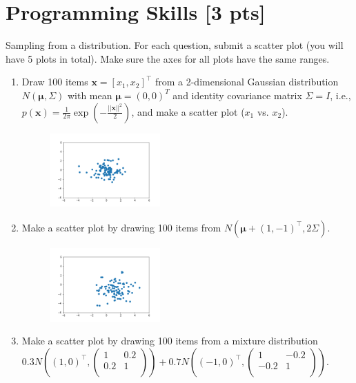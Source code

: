 \documentclass[a4paper]{article}
\theoremstyle{definition}
\newenvironment{soln}{
    \leavevmode\color{blue}\ignorespaces
}{}
\begin{document}
\section{Programming Skills [3 pts]}
Sampling from a distribution.  For each question, submit a scatter plot (you will have 5 plots in total).  Make sure the axes for all plots have the same ranges.
\begin{enumerate}
\item Draw 100 items $\mathbf{x} = [x_1, x_2]^\top$ from a
  2-dimensional Gaussian distribution $N(\mathbf{\mu}, \Sigma)$ with mean $\mathbf{\mu}=(0, 0)^T$ and
  identity covariance matrix $\Sigma=I$, i.e.,
  $p(\mathbf{x}) =
  \frac{1}{2\pi}\exp\left(-\frac{||\mathbf{x}||^2}{2}\right)$, and
  make a scatter plot ($x_1$ vs. $x_2$).  
  
	\begin{soln}
	    \begin{figure}[H]
	        \centering
	        \includegraphics[width=0.4\textwidth]{81.png}
	        \captionsetup{labelformat=empty}
	        \caption{}
	        \label{fig:my_label}
	    \end{figure}
	\end{soln}
\item Make a scatter plot by drawing 100 items from $N(\mathbf{\mu} + (1, -1)^\top, 2 \Sigma)$.

	\begin{soln}

	    \begin{figure}[H]
	        \centering
	        \includegraphics[width=0.4\textwidth]{82.png}
	        \captionsetup{labelformat=empty}
	        \caption{}
	        \label{fig:my_label}
	    \end{figure}
	\end{soln}
\item Make a scatter plot by drawing 100 items from a mixture distribution 
$0.3 N\left((1, 0)^\top, \begin{pmatrix} 1 & 0.2 \\ 0.2 & 1\\ \end{pmatrix}\right)
+0.7 N\left((-1, 0)^\top, \begin{pmatrix} 1 & -0.2 \\ -0.2 & 1\\ \end{pmatrix}\right)
$.


\end{enumerate}
\end{document}
